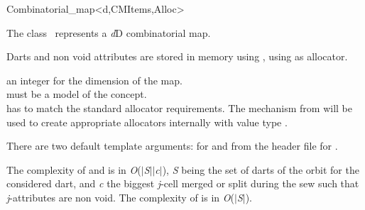 \ccRefPageBegin

\begin{ccRefClass}{Combinatorial_map<d,CMItems,Alloc>}


\ccDefinition
  
The class \ccRefName\ represents a \emph{d}D combinatorial map.

Darts and non void attributes are stored in memory using
, using  as allocator.

\ccIsModel
{}

\ccParameters
{} an integer for the dimension of the map.\\
 must be a model of the  concept. \\
 has to match the standard allocator requirements. The   mechanism from 
 will be used to create appropriate allocators internally with value type .

There are two default template arguments:
 for  and
 from the  header file for .

\ccTypes
{}
\ccGlue
{}


The complexity of  and  is in \emph{O}($|$\emph{S}$|$\mytimes{}$|$\emph{c}$|$), \emph{S}
being the set of darts of the orbit
\orbit{\betaun{},\myldots{},\betaimdeux{},\betaipdeux{},\myldots{},\betad{}} for the
considered dart, and \emph{c} the biggest \emph{j}-cell merged or
split during the sew such that \emph{j}-attributes are non void. 
The complexity of  is in \emph{O}($|$\emph{S}$|$).


\end{ccRefClass}
